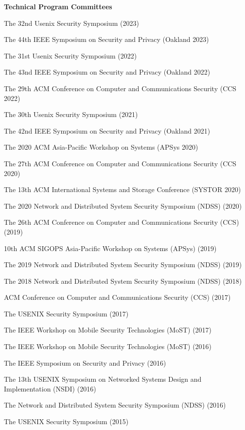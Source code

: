 \documentclass[10pt]{article}
\newenvironment{lonelist}[1][\enskip\textbullet]%
        {\vspace{-\baselineskip}\begin{list}{#1}{%
        \setlength{\partopsep}{0pt}%
        \setlength{\topsep}{0pt}
	\setlength{\leftmargin}{0pt}}}
        {\end{list}\vspace{-.6\baselineskip}}
\newenvironment{innerenum}[1][1.]%
        {\begin{compactenum}[#1]}{\end{compactenum}}
\begin{document}
\begin{lonelist}
\item[] {\bf Technical Program Committees}
\begin{innerenum}
\item The 32nd Usenix Security Symposium (2023)
\item The 44th IEEE Symposium on Security and Privacy (Oakland 2023)
\item The 31st Usenix Security Symposium (2022)
\item The 43nd IEEE Symposium on Security and Privacy (Oakland 2022)
\item The 29th ACM Conference on Computer and Communications Security (CCS 2022)
\item The 30th Usenix Security Symposium (2021)
\item The 42nd IEEE Symposium on Security and Privacy (Oakland 2021)
\item The 2020 ACM Asia-Pacific Workshop on Systems (APSys 2020)	
\item The 27th ACM Conference on Computer and Communications Security (CCS 2020) 
\item The 13th ACM International Systems and Storage Conference (SYSTOR 2020)	
\item The 2020 Network and Distributed System Security Symposium (NDSS) (2020)  
\item The 26th ACM Conference on Computer and Communications Security (CCS) (2019) 
\item 10th ACM SIGOPS Asia-Pacific Workshop on Systems (APSys) (2019)
\item The 2019 Network and Distributed System Security Symposium (NDSS) (2019)  
\item The 2018 Network and Distributed System Security Symposium (NDSS) (2018)
\item ACM Conference on Computer and Communications Security (CCS) (2017) 
\item The USENIX Security Symposium (2017)
\item The IEEE Workshop on Mobile Security Technologies (MoST) (2017)
\item The IEEE Workshop on Mobile Security Technologies (MoST) (2016)
\item The IEEE Symposium on Security and Privacy (2016)
\item The 13th USENIX Symposium on Networked Systems Design and Implementation (NSDI) (2016)
\item The Network and Distributed System Security Symposium (NDSS) (2016)
\item The USENIX Security Symposium (2015)

\end{innerenum}
\end{lonelist}
\end{document}

